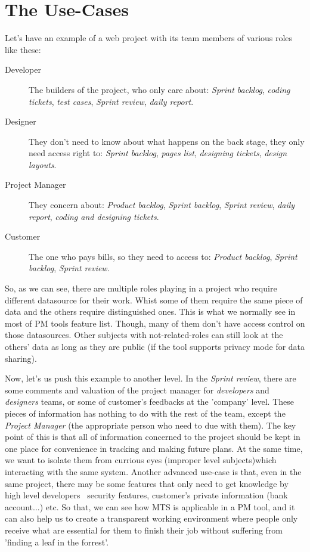 \section{The Use-Cases}
Let's have an example of a web project with its team members of various roles like these:
\begin{description}
\item[Developer] The builders of the project, who only care about: \emph{Sprint backlog}, \emph{coding tickets}, \emph{test cases}, \emph{Sprint review}, \emph{daily report}.
\item[Designer] They don't need to know about what happens on the back stage, they only need access right to: \emph{Sprint backlog}, \emph{pages list}, \emph{designing tickets}, \emph{design layouts}.
\item[Project Manager] They concern about: \emph{Product backlog}, \emph{Sprint backlog}, \emph{Sprint review}, \emph{daily report}, \emph{coding and designing tickets}.
\item[Customer] The one who pays bills, so they need to access to: \emph{Product backlog}, \emph{Sprint backlog}, \emph{Sprint review}.
\end{description}

So, as we can see, there are multiple roles playing in a project who require different datasource for their work.
Whist some of them require the same piece of data and the others require distinguished ones.
This is what we normally see in most of PM tools feature list.
Though, many of them don't have access control on those datasources.
Other subjects with not-related-roles can still look at the others' data as long as they are public (if the tool supports privacy mode for data sharing).

Now, let's us push this example to another level. In the \emph{Sprint review}, there are some comments and valuation of the project manager for \emph{developers} and \emph{designers} teams, or some of customer's feedbacks at the 'company' level.
These pieces of information has nothing to do with the rest of the team, except the \emph{Project Manager} (\ie the appropriate person who need to due with them).
The key point of this is that all of information concerned to the project should be kept in one place for convenience in tracking and making future plans.
At the same time, we want to isolate them from currious eyes (\ie improper level subjects)which interacting with the same system.
Another advanced use-case is that, even in the same project, there may be some features that only need to get knowledge by high level developers \eg\, security features, customer's private information (bank account...) etc.
So that, we can see how MTS is applicable in a PM tool, and it can also help us to create a transparent working environment where people only receive what are essential for them to finish their job without suffering from 'finding a leaf in the forrest'.

